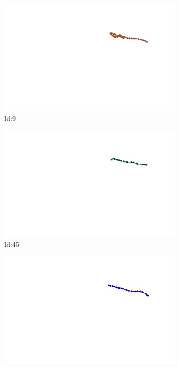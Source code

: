 \documentclass[12pt,twoside]{report}
\begin{document}
\begin{figure}
\centering
\begin{subfigure}[b]{0.20\textwidth}
\centering
\includegraphics[width=\textwidth]{../../trajectories/9.png}
\caption{Id:9}
\end{subfigure}
\begin{subfigure}[b]{0.20\textwidth}
\centering
\includegraphics[width=\textwidth]{../../trajectories/45.png}
\caption{Id:45}
\end{subfigure}
\begin{subfigure}[b]{0.20\textwidth}
\centering
\includegraphics[width=\textwidth]{../../trajectories/46.png}

\end{subfigure}
\end{figure}
\end{document}
